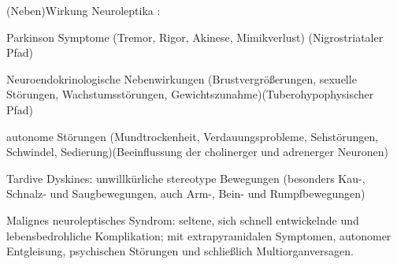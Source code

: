 \documentclass[10pt, a4paper]{exam}
\begin{document}
\begin{questions}
\begin{solution}
    (Neben)Wirkung Neuroleptika :
    \begin{itemize*}
      \item Parkinson Symptome (Tremor, Rigor, Akinese, Mimikverlust) (Nigrostriataler Pfad)
      \item Neuroendokrinologische Nebenwirkungen (Brustvergrößerungen, sexuelle Störungen, Wachstumsstörungen, Gewichtszunahme)(Tuberohypophysischer Pfad)
      \item autonome Störungen (Mundtrockenheit, Verdauungsprobleme, Sehstörungen, Schwindel, Sedierung)(Beeinflussung der cholinerger und adrenerger Neuronen)
      \item Tardive Dyskines: unwillkürliche stereotype Bewegungen (besonders Kau-, Schnalz- und Saugbewegungen, auch Arm-, Bein- und Rumpfbewegungen)
      \item Malignes neuroleptisches Syndrom: seltene, sich schnell entwickelnde und lebensbedrohliche Komplikation; mit extrapyramidalen Symptomen, autonomer Entgleisung, psychischen Störungen und schließlich Multiorganversagen.
    \end{itemize*}
  \end{solution}

\end{questions}
\end{document}
